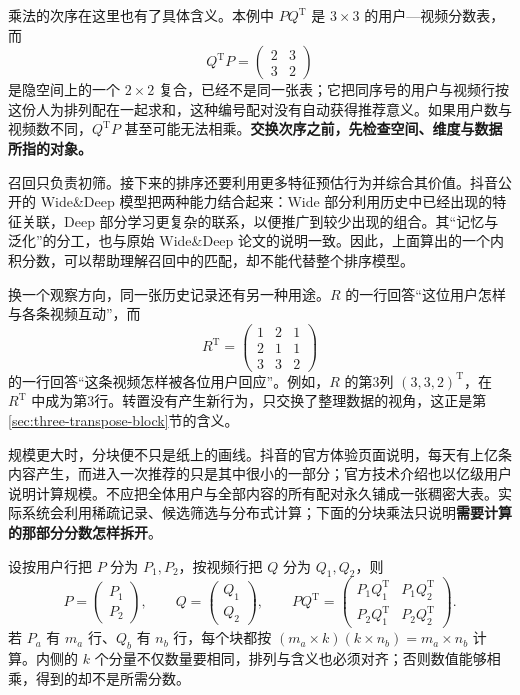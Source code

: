 \documentclass[a4paper,12pt,twoside,openany,fontset=none]{ctexbook}
\numberwithin{equation}{chapter}
\begin{document}
乘法的次序在这里也有了具体含义。本例中 $PQ^{\mathrm T}$ 是 $3\times3$ 的用户—视频分数表，而
\[
 Q^{\mathrm T}P=\begin{pmatrix}2&3\\3&2\end{pmatrix}
\]
是隐空间上的一个 $2\times2$ 复合，已经不是同一张表；它把同序号的用户与视频行按这份人为排列配在一起求和，这种编号配对没有自动获得推荐意义。如果用户数与视频数不同，$Q^{\mathrm T}P$ 甚至可能无法相乘。\textbf{交换次序之前，先检查空间、维度与数据所指的对象。}

召回只负责初筛。接下来的排序还要利用更多特征预估行为并综合其价值。抖音公开的 Wide\&Deep 模型把两种能力结合起来：Wide 部分利用历史中已经出现的特征关联，Deep 部分学习更复杂的联系，以便推广到较少出现的组合。其“记忆与泛化”的分工，也与原始 Wide\&Deep 论文的说明一致。\nobreak\cite{douyin-models,wide-deep-2016}因此，上面算出的一个内积分数，可以帮助理解召回中的匹配，却不能代替整个排序模型。

换一个观察方向，同一张历史记录还有另一种用途。$R$ 的一行回答“这位用户怎样与各条视频互动”，而
\[
 R^{\mathrm T}=\begin{pmatrix}1&2&1\\2&1&1\\3&3&2\end{pmatrix}
\]
的一行回答“这条视频怎样被各位用户回应”。例如，$R$ 的第3列 $(3,3,2)^{\mathrm T}$，在 $R^{\mathrm T}$ 中成为第3行。转置没有产生新行为，只交换了整理数据的视角，这正是第\ref{sec:three-transpose-block}节的含义。

规模更大时，分块便不只是纸上的画线。抖音的官方体验页面说明，每天有上亿条内容产生，而进入一次推荐的只是其中很小的一部分；官方技术介绍也以亿级用户说明计算规模。\nobreak\cite{douyin-recommendation,douyin-models}不应把全体用户与全部内容的所有配对永久铺成一张稠密大表。实际系统会利用稀疏记录、候选筛选与分布式计算；下面的分块乘法只说明\textbf{需要计算的那部分分数怎样拆开}。

设按用户行把 $P$ 分为 $P_1,P_2$，按视频行把 $Q$ 分为 $Q_1,Q_2$，则
\[
 P=\begin{pmatrix}P_1\\P_2\end{pmatrix},\qquad
 Q=\begin{pmatrix}Q_1\\Q_2\end{pmatrix},\qquad
 PQ^{\mathrm T}=\begin{pmatrix}
 P_1Q_1^{\mathrm T}&P_1Q_2^{\mathrm T}\\
 P_2Q_1^{\mathrm T}&P_2Q_2^{\mathrm T}
 \end{pmatrix}.
\]
若 $P_a$ 有 $m_a$ 行、$Q_b$ 有 $n_b$ 行，每个块都按 $(m_a\times k)(k\times n_b)=m_a\times n_b$ 计算。内侧的 $k$ 个分量不仅数量要相同，排列与含义也必须对齐；否则数值能够相乘，得到的却不是所需分数。
\end{document}
